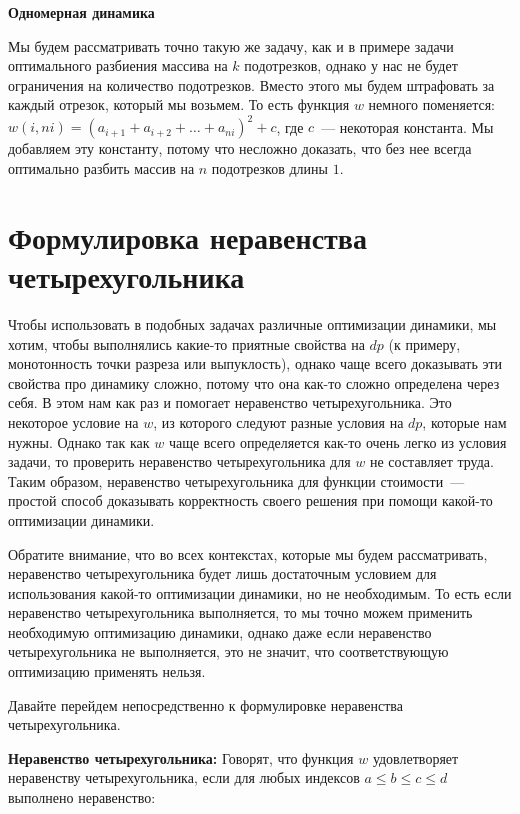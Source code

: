 \begin{example} \textbf{Одномерная динамика}

    Мы будем рассматривать точно такую же задачу, как и в примере задачи оптимального разбиения массива на $k$ подотрезков, однако у нас не будет ограничения на количество подотрезков. Вместо этого мы будем штрафовать за каждый отрезок, который мы возьмем. То есть функция $w$ немного поменяется: $w(i, ni) = (a_{i + 1} + a_{i + 2} + \ldots + a_{ni})^2 + c$, где $c$~--- некоторая константа. Мы добавляем эту константу, потому что несложно доказать, что без нее всегда оптимально разбить массив на $n$ подотрезков длины $1$.
\end{example}

\section{Формулировка неравенства четырехугольника}

Чтобы использовать в подобных задачах различные оптимизации динамики, мы хотим, чтобы выполнялись какие-то приятные свойства на $dp$ (к примеру, монотонность точки разреза или выпуклость), однако чаще всего доказывать эти свойства про динамику сложно, потому что она как-то сложно определена через себя. В этом нам как раз и помогает неравенство четырехугольника. Это некоторое условие на $w$, из которого следуют разные условия на $dp$, которые нам нужны. Однако так как $w$ чаще всего определяется как-то очень легко из условия задачи, то проверить неравенство четырехугольника для $w$ не составляет труда. Таким образом, неравенство четырехугольника для функции стоимости~--- простой способ доказывать корректность своего решения при помощи какой-то оптимизации динамики.

\begin{observation}
    Обратите внимание, что во всех контекстах, которые мы будем рассматривать, неравенство четырехугольника будет лишь достаточным условием для использования какой-то оптимизации динамики, но не необходимым. То есть если неравенство четырехугольника выполняется, то мы точно можем применить необходимую оптимизацию динамики, однако даже если неравенство четырехугольника не выполняется, это не значит, что соответствующую оптимизацию применять нельзя.
\end{observation}

Давайте перейдем непосредственно к формулировке неравенства четырехугольника.

\textbf{Неравенство четырехугольника:} Говорят, что функция $w$ удовлетворяет неравенству четырехугольника, если для любых индексов $a \le b \le c \le d$ выполнено неравенство:

